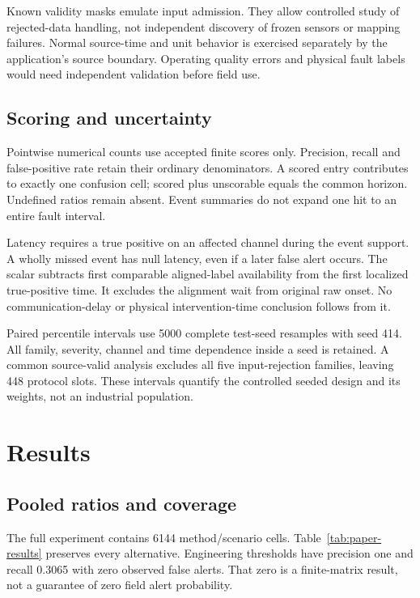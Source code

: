 \documentclass[11pt,a4paper]{article}
\begin{document}
Known validity masks emulate input admission. They allow controlled study of rejected-data handling, not independent discovery of frozen sensors or mapping failures. Normal source-time and unit behavior is exercised separately by the application's source boundary. Operating quality errors and physical fault labels would need independent validation before field use.

\subsection{Scoring and uncertainty}
Pointwise numerical counts use accepted finite scores only. Precision, recall and false-positive rate retain their ordinary denominators. A scored entry contributes to exactly one confusion cell; scored plus unscorable equals the common horizon. Undefined ratios remain absent. Event summaries do not expand one hit to an entire fault interval.

Latency requires a true positive on an affected channel during the event support. A wholly missed event has null latency, even if a later false alert occurs. The scalar subtracts first comparable aligned-label availability from the first localized true-positive time. It excludes the alignment wait from original raw onset. No communication-delay or physical intervention-time conclusion follows from it.

Paired percentile intervals use 5000 complete test-seed resamples with seed 414. All family, severity, channel and time dependence inside a seed is retained. A common source-valid analysis excludes all five input-rejection families, leaving 448 protocol slots. These intervals quantify the controlled seeded design and its weights, not an industrial population.

\section{Results}
\subsection{Pooled ratios and coverage}
The full experiment contains 6144 method/scenario cells. Table~\ref{tab:paper-results} preserves every alternative. Engineering thresholds have precision one and recall 0.3065 with zero observed false alerts. That zero is a finite-matrix result, not a guarantee of zero field alert probability.

\begin{table}[htbp]\centering\scriptsize
\caption{Valid-finite pointwise ratios and score coverage. All counts are recomputed from the full controlled matrix.}\label{tab:paper-results}

\end{table}
\end{document}
